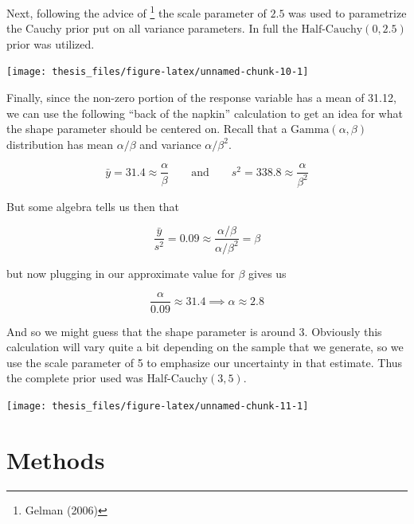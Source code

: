 \documentclass[12pt,twoside]{reedthesis}
\begin{document}
Next, following the advice of \footnote{Gelman (2006)} the scale parameter of \(2.5\) was used to parametrize the Cauchy prior put on all variance parameters. In full the \(\text{Half-Cauchy}(0, 2.5)\) prior was utilized.
\begin{center}\texttt{[image: thesis\_files/figure-latex/unnamed-chunk-10-1]} \end{center}

Finally, since the non-zero portion of the response variable has a mean of 31.12, we can use the following ``back of the napkin'' calculation to get an idea for what the shape parameter should be centered on. Recall that a \(\text{Gamma}(\alpha, \beta)\) distribution has mean \(\alpha / \beta\) and variance \(\alpha / \beta^2\).

\[
\bar{y} = 31.4 \approx \frac{\alpha}{\beta}\qquad \text{and} \qquad s^2 = 338.8 \approx \frac{\alpha}{\beta^2}
\]

But some algebra tells us then that

\[
\frac{\bar{y}}{s^2} = 0.09 \approx \frac{\alpha / \beta}{\alpha / \beta^2} = \beta 
\]

but now plugging in our approximate value for \(\beta\) gives us

\[
\frac{\alpha}{0.09} \approx 31.4 \implies \alpha \approx 2.8
\]

And so we might guess that the shape parameter is around 3. Obviously this calculation will vary quite a bit depending on the sample that we generate, so we use the scale parameter of 5 to emphasize our uncertainty in that estimate. Thus the complete prior used was \(\text{Half-Cauchy}(3, 5)\).
\begin{center}\texttt{[image: thesis\_files/figure-latex/unnamed-chunk-11-1]} \end{center}

\hypertarget{methods}{%
\section{Methods}\label{methods}}
\end{document}
